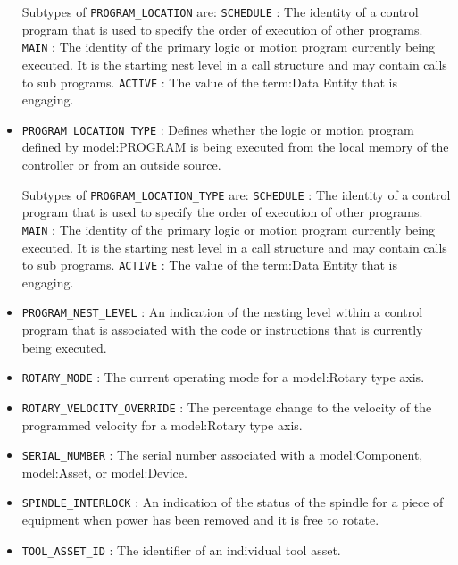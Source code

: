 \begin{itemize}
Subtypes of \texttt{PROGRAM_LOCATION} are: 
\newline\tab \texttt{SCHEDULE} : The identity of a control program that is used to specify the order of execution of other programs. 
\newline\tab \texttt{MAIN} : The identity of the primary logic or motion program currently being executed. It is the starting nest level in a call structure and may contain calls to sub programs. 
\newline\tab \texttt{ACTIVE} : The value of the {term:Data Entity} that is engaging. 
\item \texttt{PROGRAM_LOCATION_TYPE} : Defines whether the logic or motion program defined by {model:PROGRAM} is being executed from the local memory of the controller or from an outside source. 

Subtypes of \texttt{PROGRAM_LOCATION_TYPE} are: 
\newline\tab \texttt{SCHEDULE} : The identity of a control program that is used to specify the order of execution of other programs. 
\newline\tab \texttt{MAIN} : The identity of the primary logic or motion program currently being executed. It is the starting nest level in a call structure and may contain calls to sub programs. 
\newline\tab \texttt{ACTIVE} : The value of the {term:Data Entity} that is engaging. 
\item \texttt{PROGRAM_NEST_LEVEL} : An indication of the nesting level within a control program that is associated with the code or instructions that is currently being executed. 

\item \texttt{ROTARY_MODE} : The current operating mode for a {model:Rotary} type axis. 

\item \texttt{ROTARY_VELOCITY_OVERRIDE} : The percentage change to the velocity of the programmed velocity for a {model:Rotary} type axis. 

\item \texttt{SERIAL_NUMBER} : The serial number associated with a {model:Component}, {model:Asset}, or {model:Device}. 

\item \texttt{SPINDLE_INTERLOCK} : An indication of the status of the spindle for a piece of equipment when power has been removed and it is free to rotate. 

\item \texttt{TOOL_ASSET_ID} : The identifier of an individual tool asset. 


\end{itemize}
